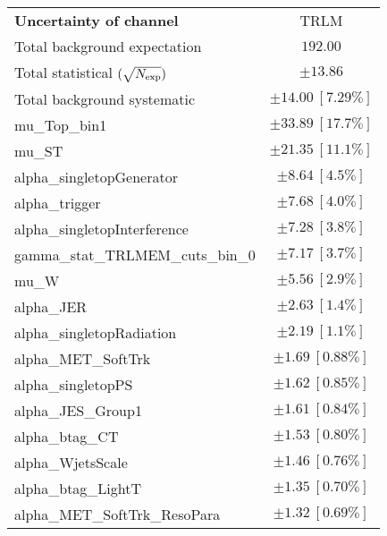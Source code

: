 
\begin{table}
\begin{center}
\setlength{\tabcolsep}{0.0pc}
\begin{tabular*}{\textwidth}{@{\extracolsep{\fill}}lc}
\noalign{\smallskip}\hline\noalign{\smallskip}
{\bf Uncertainty of channel}                                    & TRLM            \\
\noalign{\smallskip}\hline\noalign{\smallskip}
Total background expectation             &  $192.00$       \\
\noalign{\smallskip}\hline\noalign{\smallskip}
Total statistical $(\sqrt{N_{\rm exp}})$              & $\pm 13.86$       \\
Total background systematic               & $\pm 14.00\ [7.29\%] $             \\
\noalign{\smallskip}\hline\noalign{\smallskip}
\noalign{\smallskip}\hline\noalign{\smallskip}
mu\_Top\_bin1         & $\pm 33.89\ [17.7\%] $       \\
mu\_ST         & $\pm 21.35\ [11.1\%] $       \\
alpha\_singletopGenerator         & $\pm 8.64\ [4.5\%] $       \\
alpha\_trigger         & $\pm 7.68\ [4.0\%] $       \\
alpha\_singletopInterference         & $\pm 7.28\ [3.8\%] $       \\
gamma\_stat\_TRLMEM\_cuts\_bin\_0         & $\pm 7.17\ [3.7\%] $       \\
mu\_W         & $\pm 5.56\ [2.9\%] $       \\
alpha\_JER         & $\pm 2.63\ [1.4\%] $       \\
alpha\_singletopRadiation         & $\pm 2.19\ [1.1\%] $       \\
alpha\_MET\_SoftTrk         & $\pm 1.69\ [0.88\%] $       \\
alpha\_singletopPS         & $\pm 1.62\ [0.85\%] $       \\
alpha\_JES\_Group1         & $\pm 1.61\ [0.84\%] $       \\
alpha\_btag\_CT         & $\pm 1.53\ [0.80\%] $       \\
alpha\_WjetsScale         & $\pm 1.46\ [0.76\%] $       \\
alpha\_btag\_LightT         & $\pm 1.35\ [0.70\%] $       \\
alpha\_MET\_SoftTrk\_ResoPara         & $\pm 1.32\ [0.69\%] $       \\

\end{tabular*}
\end{center}
\end{table}
